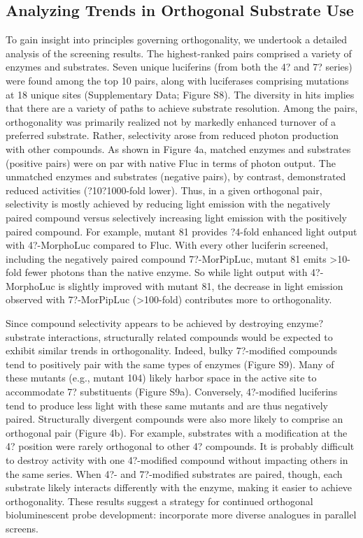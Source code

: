 \subsection*{Analyzing Trends in Orthogonal Substrate Use}
To gain insight into principles governing orthogonality, we undertook a detailed analysis of the screening results. The highest-ranked pairs comprised a variety of enzymes and substrates. Seven unique luciferins (from both the 4? and 7? series) were found among the top 10 pairs, along with luciferases comprising mutations at 18 unique sites (Supplementary Data; Figure S8). The diversity in hits implies that there are a variety of paths to achieve substrate resolution. Among the pairs, orthogonality was primarily realized not by markedly enhanced turnover of a preferred substrate. Rather, selectivity arose from reduced photon production with other compounds. As shown in Figure 4a, matched enzymes and substrates (positive pairs) were on par with native Fluc in terms of photon output. The unmatched enzymes and substrates (negative pairs), by contrast, demonstrated reduced activities (?10?1000-fold lower). Thus, in a given orthogonal pair, selectivity is mostly achieved by reducing light emission with the negatively paired compound versus selectively increasing light emission with the positively paired compound. For example, mutant 81 provides ?4-fold enhanced light output with 4?-MorphoLuc compared to Fluc. With every other luciferin screened, including the negatively paired compound 7?-MorPipLuc, mutant 81 emits >10-fold fewer photons than the native enzyme. So while light output with 4?-MorphoLuc is slightly improved with mutant 81, the decrease in light emission observed with 7?-MorPipLuc (>100-fold) contributes more to orthogonality.
\par
Since compound selectivity appears to be achieved by destroying enzyme?substrate interactions, structurally related compounds would be expected to exhibit similar trends in orthogonality. Indeed, bulky 7?-modified compounds tend to positively pair with the same types of enzymes (Figure S9). Many of these mutants (e.g., mutant 104) likely harbor space in the active site to accommodate 7? substituents (Figure S9a). Conversely, 4?-modified luciferins tend to produce less light with these same mutants and are thus negatively paired. Structurally divergent compounds were also more likely to comprise an orthogonal pair (Figure 4b). For example, substrates with a modification at the 4? position were rarely orthogonal to other 4? compounds. It is probably difficult to destroy activity with one 4?-modified compound without impacting others in the same series. When 4?- and 7?-modified substrates are paired, though, each substrate likely interacts differently with the enzyme, making it easier to achieve orthogonality. These results suggest a strategy for continued orthogonal bioluminescent probe development: incorporate more diverse analogues in parallel screens.
